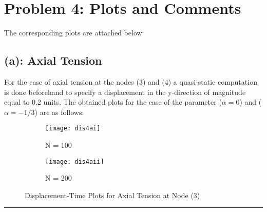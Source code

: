 \section*{Problem 4: Plots and Comments}
The corresponding plots are attached below: 
\subsection*{(a): Axial Tension }
For the case of axial tension at the nodes (3) and (4) a quasi-static computation is done beforehand to specify a displacement in the y-direction of magnitude equal to 0.2 units. The obtained plots for the case of the parameter ($\alpha = 0$) and ($\alpha = -1/3$) are as follows: 
\begin{figure}[h!]
\centering
\begin{subfigure}{.5\textwidth}
  \centering
  \texttt{[image: dis4ai]}
  \caption{N = 100}
  \label{fig:sub1}
\end{subfigure}%
\begin{subfigure}{.5\textwidth}
  \centering
  \texttt{[image: dis4aii]}
  \caption{N = 200}
  \label{fig:sub2}
\end{subfigure}
\caption{ Displacement-Time Plots for Axial Tension at Node (3) }
\label{Axial-Tension}
\end{figure}\hrule
